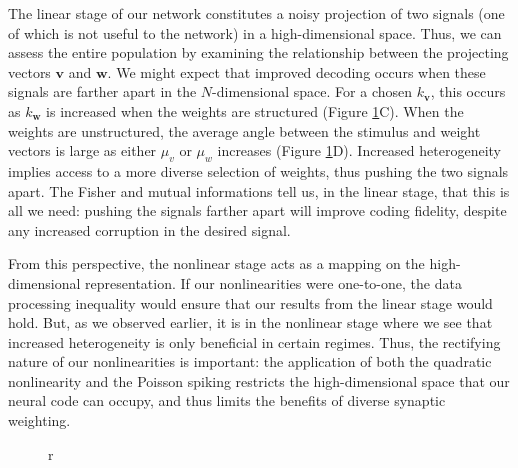 \documentclass[12pt]{article}
\begin{document}
The linear stage of our network constitutes a noisy projection of two signals (one of which is not useful to the network) in a high-dimensional space. Thus, we can assess the entire population by examining the relationship between the projecting vectors $\mathbf{v}$ and $\mathbf{w}$. We might expect that improved decoding occurs when these signals are farther apart in the $N$-dimensional space. For a chosen $k_{\mathbf{v}}$, this occurs as $k_{\mathbf{w}}$ is increased when the weights are structured (Figure \ref{fig:figure9}C). When the weights are unstructured, the average angle between the stimulus and weight vectors is large as either $\mu_v$ or $\mu_w$ increases (Figure \ref{fig:figure9}D). Increased heterogeneity implies access to a more diverse selection of weights, thus pushing the two signals apart. The Fisher and mutual informations tell us, in the linear stage, that this is all we need: pushing the signals farther apart will improve coding fidelity, despite any increased corruption in the desired signal.

From this perspective, the nonlinear stage acts as a mapping on the high-dimensional representation. If our nonlinearities were one-to-one, the data processing inequality would ensure that our results from the linear stage would hold. But, as we observed earlier, it is in the nonlinear stage where we see that increased heterogeneity is only beneficial in certain regimes. Thus, the rectifying nature of our nonlinearities is important: the application of both the quadratic nonlinearity and the Poisson spiking restricts the high-dimensional space that our neural code can occupy, and thus limits the benefits of diverse synaptic weighting. 
	
\begin{figure}[t]
	\centering
	\caption{r}
	\label{fig:figure9}
\end{figure}
\end{document}
